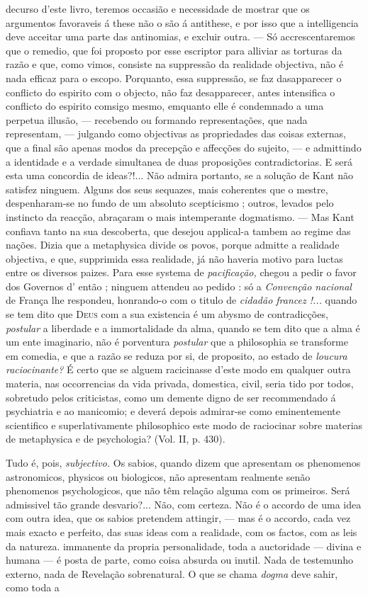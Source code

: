 decurso d'este livro, teremos occasião e necessidade de mostrar que os argumentos favoraveis á these não o são á antithese, e por isso que a intelligencia deve acceitar uma parte das antinomias, e excluir outra. --- Só accrescentaremos que o remedio, que foi proposto por esse escriptor para alliviar as torturas da razão e que, como vimos, consiste na suppressão da realidade objectiva, não é nada efficaz para o escopo. Porquanto, essa suppressão, se faz dasapparecer o conflicto do espirito com o objecto, não faz desapparecer, antes intensifica o conflicto do espirito comsigo mesmo, emquanto elle é condemnado a uma perpetua illusão, --- recebendo ou formando representações, que nada representam, --- julgando como objectivas as propriedades das coisas externas, que a final são apenas modos da precepção e affecções do sujeito, --- e admittindo a identidade e a verdade simultanea de duas proposições contradictorias. E será esta uma concordia de ideas?!... Não admira portanto, se a solução de Kant não satisfez ninguem. Alguns dos seus sequazes, mais coherentes que o mestre, despenharam-se no fundo de um absoluto scepticismo ; outros, levados pelo instincto da reacção, abraçaram o mais intemperante dogmatismo. --- Mas Kant confiava tanto na sua descoberta, que desejou applical-a tambem ao regime das nações. Dizia que a metaphysica divide os povos, porque admitte a realidade objectiva, e que, supprimida essa realidade, já não haveria motivo para luctas entre os diversos paizes. Para esse systema de \emph{pacificação,} chegou a pedir o favor dos Governos d' então ; ninguem attendeu ao pedido : só a \emph{Convenção nacional} de França lhe respondeu, honrando-o com o titulo de \emph{cidadão francez !...} quando se tem dito que \textsc{Deus} com a sua existencia é um abysmo de contradicções, \emph{postular} a liberdade e a immortalidade da alma, quando se tem dito que a alma é um ente imaginario, não é porventura \emph{postular} que a philosophia se transforme em comedia, e que a razão se reduza por si, de proposito, ao estado de \emph{loucura raciocinante?} É certo que se alguem racicinasse d'este modo em qualquer outra materia, nas occorrencias da vida privada, domestica, civil, seria tido por todos, sobretudo pelos criticistas, como um demente digno de ser recommendado á psychiatria e ao manicomio; e deverá depois admirar-se como eminentemente scientifico e superlativamente philosophico este modo de raciocinar sobre materias de metaphysica e de psychologia? (Vol. II, p. 430).\par Tudo é, pois, \emph{subjectivo.} Os sabios, quando dizem que apresentam os phenomenos astronomicos, physicos ou biologicos, não apresentam realmente senão phenomenos psychologicos, que não têm relação alguma com os primeiros. Será admissivel tão grande desvario?... Não, com certeza. Não é o accordo de uma idea com outra idea, que os sabios pretendem attingir, --- mas é o accordo, cada vez mais exacto e perfeito, das suas ideas com a realidade, com os factos, com as leis da natureza. immanente da propria personalidade, toda a auctoridade --- divina e humana --- é posta de parte, como coisa absurda ou inutil. Nada de testemunho externo, nada de Revelação sobrenatural. O que se chama \emph{dogma} deve sahir, como toda a 